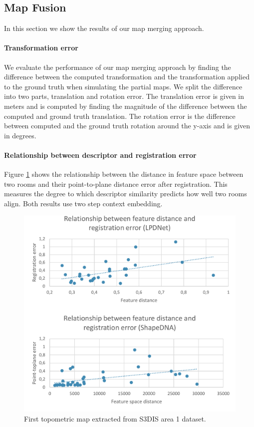 \pagebreak

\subsection{Map Fusion}
In this section we show the results of our map merging approach. 

\paragraph{Transformation error}
We evaluate the performance of our map merging approach by finding the difference between the computed transformation and the transformation applied to the ground truth when simulating the partial maps. We split the difference into two parts, translation and rotation error. The translation error is given in meters and is computed by finding the magnitude of the difference between the computed and ground truth translation. The rotation error is the difference between computed and the ground truth rotation around the y-axis and is given in degrees.

\paragraph{Relationship between descriptor and registration error}
Figure \ref{fig:lpdnet_registration} shows the relationship between the distance in feature space between two rooms and their point-to-plane distance error after registration. This measures the degree to which descriptor similarity predicts how well two rooms align. Both results use two step context embedding.


\begin{figure}[h]
    \centering
    \includegraphics*[width=\textwidth]{./fig/registration_charts.pdf}
    \caption{First topometric map extracted from S3DIS area 1 dataset.}
    \label{fig:lpdnet_registration}
\end{figure}


